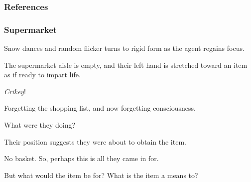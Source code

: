 \documentclass[noamssymb,
graphics,
]{beamer} %
\begin{document}
\begin{frame}[noframenumbering]
  \frametitle{References}
  {
    \renewcommand*{\bibfont}{\scriptsize}
    \printbibliography
  }
\end{frame}




\begin{frame}
  \frametitle{Supermarket}

  {\rmfamily

    Snow dances and random flicker turns to rigid form as the agent regains focus.

    The supermarket aisle is empty, and their left hand is stretched toward an item as if ready to impart life.

    \emph{Crikey}!

    Forgetting the shopping list, and now forgetting consciousness.

    What were they doing?

    Their position suggests they were about to obtain the item.

    No basket. So, perhaps this is all they came in for.

    But what would the item be for? What is the item a means to?

  }
\end{frame}
\end{document}
